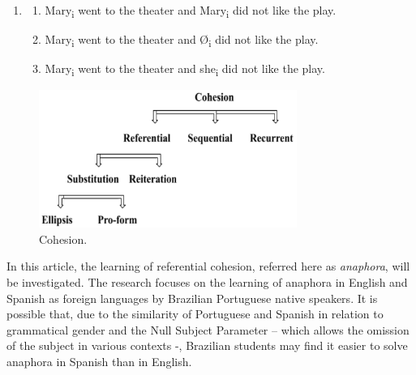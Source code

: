 \documentclass{textolivre}
\begin{document}
%
%
\begin{enumerate}[wide,label=(\arabic*),topsep=1ex,partopsep=1ex,noitemsep,leftmargin=0.15cm,resume]
\setlength{\itemindent}{0em}
\item[]{} \addtocounter{enumi}{1}
\begin{enumerate}[wide,label=(\arabic{enumi}\alph*),topsep=1ex,partopsep=1ex,noitemsep]
\setlength{\itemindent}{0em}
\item \label{itm-5a} Mary\textsubscript{i} went to the theater and Mary\textsubscript{i} did not like the play.
\item \label{itm-5b} Mary\textsubscript{i} went to the theater and Ø\textsubscript{i} did not like the play.
\item \label{itm-5c} Mary\textsubscript{i} went to the theater and she\textsubscript{i} did not like the play.
\end{enumerate}
\end{enumerate}



% 
%
\begin{figure}[htbp]
 \centering
 \includegraphics[width=0.75\textwidth]{fig02.png}
 \caption{Cohesion.}
 \label{fig02}
\end{figure}




In this article, the learning of referential cohesion, referred here as
\emph{anaphora}, will be investigated. The research focuses on the
learning of anaphora in English and Spanish as foreign languages by
Brazilian Portuguese native speakers. It is possible that, due to the
similarity of Portuguese and Spanish in relation to grammatical gender
and the Null Subject Parameter \cite{chomsky_lectures_1981,rizzi_issues_1982} -- which
allows the omission of the subject in various contexts -, Brazilian
students may find it easier to solve anaphora in Spanish than in
English.
\end{document}
